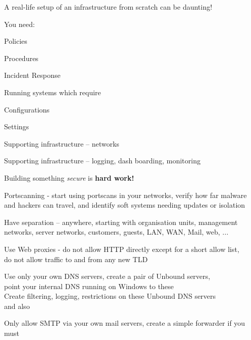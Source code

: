 \documentclass[Screen16to9,17pt]{foils}
\begin{document}

\begin{list1}
\item A real-life setup of an infrastructure from scratch can be daunting!
\item You need:
\begin{list2}
\item Policies
\item Procedures
\item Incident Response
\end{list2}
\item Running systems which require
\begin{list2}
\item Configurations
\item Settings
\item Supporting infrastructure -- networks
\item Supporting infrastructure -- logging, dash boarding, monitoring
\end{list2}
\item Building something \emph{secure} is {\bf hard work!}
\end{list1}






\begin{list2}
\item Portscanning - start using portscans in your networks, verify how far malware and hackers can travel, and identify soft systems needing updates or isolation
\item Have separation -- anywhere, starting with organisation units, management networks, server networks, customers, guests, LAN, WAN, Mail, web, ...
\item Use Web proxies - do not allow HTTP directly except for a short allow list, \\
do not allow traffic to and from any new TLD
\item Use only your own DNS servers, create a pair of Unbound servers, \\
point your internal DNS running on Windows to these\\
Create filtering, logging, restrictions on these Unbound DNS servers\\
 and also 
\item Only allow SMTP via your own mail servers, create a simple forwarder if you must
\end{list2}
\end{document}
